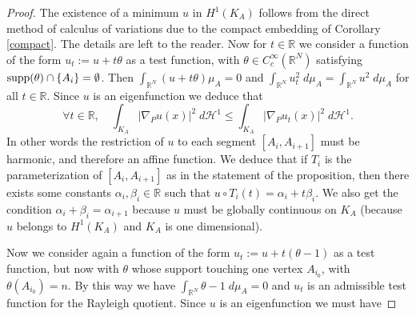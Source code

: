 \documentclass[12pt,english]{smfart} %
\theoremstyle{remark}
\newcommand{\R}{\mathbb{R}}
\begin{document}
\begin{proof}  The existence of a minimum $u$ in $H^1(K_A)$ follows from the direct method of calculus of variations due to the compact embedding of Corollary \ref{compact}. The details are left to the reader. Now for  $t\in \R$ we consider a function of the form  $u_t:=u+t \theta$ as a test function, with $\theta \in C^\infty_c(\R^N)$ satisfying ${\rm supp}(\theta) \cap \{A_i\}=\emptyset$. Then $\int_{\R^N}(u+t \theta )\mu_A=0$ and $\int_{\mathbb{R}^N} u_t^2\;d\mu_A=\int_{\mathbb{R}^N} u^2\;d\mu_A$ for all $t \in \R$. Since $u$ is an eigenfunction we deduce that 
 $$ \forall t \in \mathbb{R},\quad \int_{K_A} |\nabla_P u(x)|^2 \;d  \mathcal{H}^1  \leqslant  \int_{K_A} |\nabla_P u_t(x)|^2 \;d \mathcal{H}^1. $$
 In other words the restriction of $u$ to each segment $[A_i,A_{i+1}]$ must be harmonic, and therefore an affine function. We deduce that if $T_i$ is the parameterization of $[A_i,A_{i+1}]$ as in the statement  of the proposition, then there exists some constants $\alpha_i,\beta_i \in \R$ such that 
$u\circ T_i(t)=\alpha_i + t \beta_i$. We also get the condition $\alpha_i+\beta_i=\alpha_{i+1}$ because $u$ must be globally continuous on $K_A$ (because $u$ belongs to $H^1(K_A)$ and $K_A$ is one dimensional). 

 Now we consider again a function of the form  $u_t:=u+t ( \theta-1)$ as a test function, but now with $\theta$ whose support touching one vertex $A_{i_0}$, with $\theta(A_{i_0})=n$. By this way we have $\int_{\R^N} \theta-1 \; d\mu_A=0$ and $u_t$ is an admissible test function for the Rayleigh quotient. Since $u$ is an eigenfunction we must have 
  

\end{proof}
\end{document}
